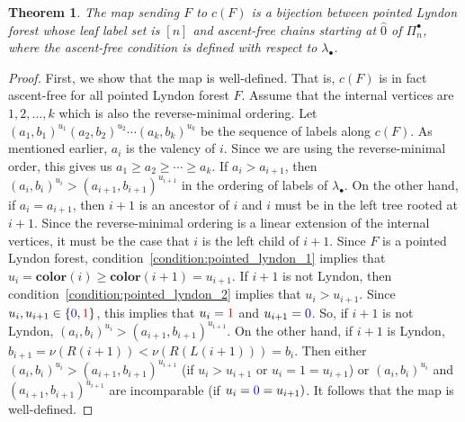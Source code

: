 \documentclass[11pt]{article}
\newtheorem{theo}{Theorem}[section]
\theoremstyle{definition}
\numberwithin{equation}{section}
\newcommand{\clr}{\mathbf{color}}
\newcommand{\tre}[1]{{\color{red}{#1}}}
\newcommand{\tbl}[1]{{\color{blue}{#1}}}
\begin{document}
\begin{theo}\label{thm:bijectionBetweenForestAndChain}
The map sending $F$ to $c(F)$ is a bijection between pointed Lyndon forest whose leaf label set is $[n]$ and ascent-free chains starting at $\hat{0}$ of $\Pi_n^\bullet$, where the  ascent-free condition is defined with respect to $\lambda_\bullet$.
\end{theo}
\begin{proof}
First, we show that the map  is well-defined.   That is, $c(F)$ is in fact ascent-free for all pointed Lyndon forest $F$.  Assume that the internal vertices are  $1,2,\dots, k$ which is also the reverse-minimal ordering.   Let $(a_1,b_1)^{u_1}(a_2,b_2)^{u_2}\cdots (a_{k},b_{k})^{u_{k}}$ be the sequence of labels along $c(F)$.   As mentioned earlier, $a_i$ is the valency of $i$. Since we are using the reverse-minimal order, this gives us $a_1\geq a_2\geq \cdots \geq a_k$.  If $a_i> a_{i+1}$, then $(a_i,b_i)^{u_i} > (a_{i+1},b_{i+1})^{u_{i+1}}$ in the ordering of labels of $\lambda_\bullet$.  On the other hand, if $a_i=a_{i+1}$,  then  $i+1$ is an ancestor of $i$ and $i$ must be in the left tree rooted at $i+1$.  Since the reverse-minimal ordering is a linear extension of the internal vertices, it must be the case that $i$ is the left child of $i+1$.  Since $F$ is a  pointed Lyndon forest, condition~\eqref{condition:pointed_lyndon_1} implies that $u_i = \clr(i) \geq \clr(i+1) =u_{i+1}$.  If $i+1$ is not Lyndon, then condition~\eqref{condition:pointed_lyndon_2} implies that $u_i>u_{i+1}$. Since $u_i,u_{i+1}\in \{\tbl{0},\tre{1}\}$, this implies that $u_i=\tre{1}$ and $u_{i+1}=\tbl{0}$. So, if $i+1$ is not Lyndon, $(a_i,b_i)^{u_i} > (a_{i+1},b_{i+1})^{u_{i+1}}$.  On the other hand, if $i+1$ is Lyndon, $b_{i+1}=\nu(R(i+1)) <\nu(R(L(i+1))) =b_{i}$.  Then either $(a_i,b_i)^{u_i} > (a_{i+1},b_{i+1})^{u_{i+1}}$ (if $u_i>u_{i+1}$  or $u_i=1=u_{i+1}$) or   $(a_i,b_i)^{u_i}$ and $(a_{i+1},b_{i+1})^{u_{i+1}}$  are incomparable (if $u_i=\tbl{0}=u_{i+1})$.   It follows that the map is well-defined.
  

\end{proof}
\end{document}
